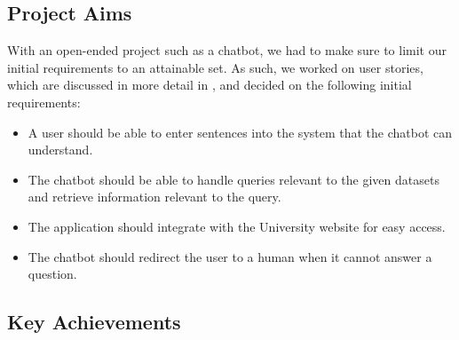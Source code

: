 \documentclass{l3proj}
\begin{document}
\subsection{Project Aims}

With an open-ended project such as a chatbot, we had to make sure to limit our initial requirements to an attainable set. As such, we worked on user stories, which are discussed in more detail in , and decided on the following initial requirements:
\begin{itemize}
\item A user should be able to enter sentences into the system that the chatbot can understand.
\item The chatbot should be able to handle queries relevant to the given datasets and retrieve information relevant to the query.
\item The application should integrate with the University website for easy access.
\item The chatbot should redirect the user to a human when it cannot answer a question.
\end{itemize}

\subsection{Key Achievements}

\end{document}
